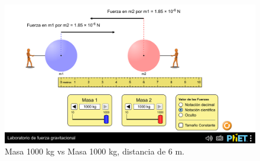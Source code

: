 \documentclass[a4paper,12pt]{article}
\begin{document}
\begin{figure}[h]
    \centering
    \includegraphics[width=1\linewidth]{m1_1000_m2_1000_r_6.png}
    \caption{Masa 1000 kg vs Masa 1000 kg, distancia de 6 m.}
\end{figure}
\end{document}
